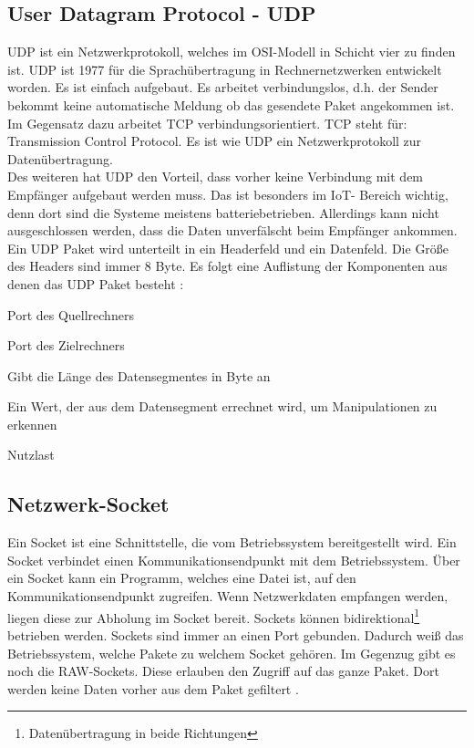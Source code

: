 \subsection{User Datagram Protocol - UDP}
UDP ist ein Netzwerkprotokoll, welches im OSI-Modell in Schicht vier zu finden ist. UDP ist 1977 für die Sprachübertragung in Rechnernetzwerken entwickelt worden. Es ist einfach aufgebaut. Es arbeitet verbindungslos, d.h. der Sender bekommt keine automatische Meldung ob das gesendete Paket angekommen ist. Im Gegensatz dazu arbeitet TCP verbindungsorientiert. TCP steht für: Transmission Control Protocol. Es ist wie UDP ein Netzwerkprotokoll zur Datenübertragung.
\\
Des weiteren hat UDP den Vorteil, dass vorher keine Verbindung mit dem Empfänger aufgebaut werden muss. Das ist besonders im IoT- Bereich wichtig, denn dort sind die Systeme meistens batteriebetrieben. Allerdings kann nicht ausgeschlossen werden, dass die Daten unverfälscht beim Empfänger ankommen.
\\
Ein UDP Paket wird unterteilt in ein Headerfeld und ein Datenfeld. Die Größe des Headers sind immer 8 Byte. Es folgt eine Auflistung der Komponenten aus denen das UDP Paket besteht \cite{src_UDP}:

\begin{description}[style=multiline,leftmargin=3cm]
\item [Quellport] 	Port des Quellrechners
\item [Zielport]  	Port des Zielrechners
\item [Länge]		Gibt die Länge des Datensegmentes in Byte an
\item [Prüfsumme]	Ein Wert, der aus dem Datensegment errechnet wird, um Manipulationen zu erkennen
\item [Daten]		Nutzlast
\end{description}

\subsection{Netzwerk-Socket}
Ein Socket ist eine Schnittstelle, die vom Betriebssystem bereitgestellt wird. Ein Socket verbindet einen Kommunikationsendpunkt mit dem Betriebssystem. Über ein Socket kann ein Programm, welches eine Datei ist, auf den Kommunikationsendpunkt zugreifen. Wenn Netzwerkdaten empfangen werden, liegen diese zur Abholung im Socket bereit. Sockets können bidirektional\footnote{Datenübertragung in beide Richtungen} betrieben werden. Sockets sind immer an einen Port gebunden. Dadurch weiß das Betriebssystem, welche Pakete zu welchem Socket gehören. Im Gegenzug gibt es noch die RAW-Sockets. Diese erlauben den Zugriff auf das ganze Paket. Dort werden keine Daten vorher aus dem Paket gefiltert \cite{src_SOCKET}.

